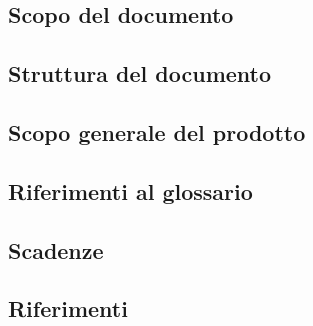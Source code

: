 \subsection{Scopo del documento}\label{sec:Scopo-documento}


\subsection{Struttura del documento}\label{sec:Struttura-documento}

    
\subsection{Scopo generale del prodotto}\label{sec:Scopo-prodotto}


\subsection{Riferimenti al glossario}\label{sec:Glossario}


\subsection{Scadenze}\label{sec:Scadenze}
  

\subsection{Riferimenti}\label{sec:Riferimenti}
  
    